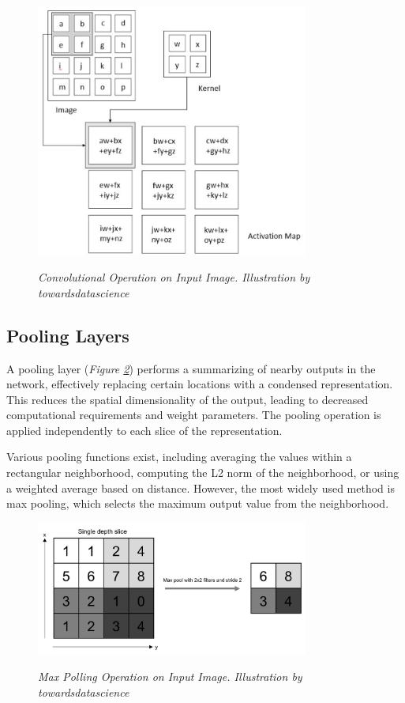 \begin{figure}[H] \centering
  \includegraphics[width=0.8\textwidth]{imatges/preliminaries/convolutional-layer.png}
  \caption[Convolutional Operation on Input Image]{\textit{Convolutional
  Operation on Input Image. Illustration by towardsdatascience}}
{\label{fig:convolutional-layer}} \end{figure}


\subsection{Pooling Layers}

A pooling layer (\textit{Figure \ref{fig:pooling-layer}}) performs a
summarizing of nearby outputs in the network, effectively replacing certain
locations with a condensed representation. This reduces the spatial
dimensionality of the output, leading to decreased computational requirements
and weight parameters. The pooling operation is applied independently to each
slice of the representation. \newline

Various pooling functions exist, including averaging the values within a
rectangular neighborhood, computing the L2 norm of the neighborhood, or using a
weighted average based on distance. However, the most widely used method is max
pooling, which selects the maximum output value from the neighborhood.

\newpage

\begin{figure}[H]
  \centering
  \includegraphics[width=0.8\textwidth]{imatges/preliminaries/polling-layer.png}
  \caption[Max Polling Operation on Input Image]{\textit{Max Polling Operation on Input Image. Illustration by towardsdatascience}}
  {\label{fig:pooling-layer}}
\end{figure}

